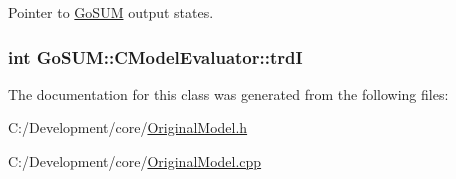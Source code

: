 Pointer to \hyperlink{struct_go_s_u_m}{Go\-S\-U\-M} output states. 

\hypertarget{class_go_s_u_m_1_1_c_model_evaluator_a3c67f2a94d451003729e0334746637df}{
\subsubsection[{trd\-I}]{\setlength{\rightskip}{0pt plus 5cm}int Go\-S\-U\-M\-::\-C\-Model\-Evaluator\-::trd\-I\hspace{0.3cm}{\ttfamily [protected]}}}\label{class_go_s_u_m_1_1_c_model_evaluator_a3c67f2a94d451003729e0334746637df}


The documentation for this class was generated from the following files\-:\begin{DoxyCompactItemize}
\item 
C\-:/\-Development/core/\hyperlink{_original_model_8h}{Original\-Model.\-h}\item 
C\-:/\-Development/core/\hyperlink{_original_model_8cpp}{Original\-Model.\-cpp}\end{DoxyCompactItemize}
